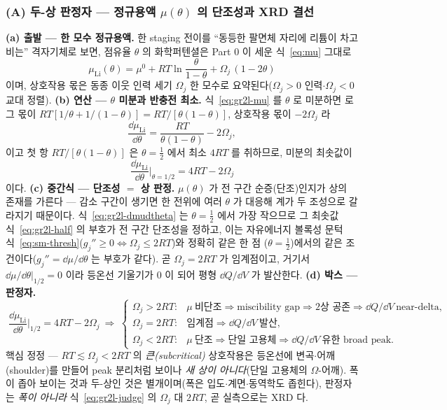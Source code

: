 \subsubsection*{(A) 두-상 판정자 --- 정규용액 $\mu(\theta)$ 의 단조성과 XRD 결선}
\textbf{(a) 출발 --- 한 모수 정규용액.} 한 staging 전이를 ``동등한 팔면체 자리에 리튬이 차고 비는'' 격자기체로
보면, 점유율 $\theta$ 의 화학퍼텐셜은 Part 0 이 세운 식~\eqref{eq:mu} 그대로
\begin{equation}
\mu_\mathrm{Li}(\theta)=\mu^0+RT\ln\frac{\theta}{1-\theta}+\Omega_j\,(1-2\theta)
\label{eq:gr2l-mu}
\end{equation}
이며, 상호작용 몫은 동종 이웃 인력 세기 $\Omega_j$ 한 모수로 요약된다($\Omega_j>0$ 인력$\cdot$$\Omega_j<0$
교대 정렬). \textbf{(b) 연산 --- $\theta$ 미분과 반충전 최소.} 식~\eqref{eq:gr2l-mu} 를 $\theta$ 로 미분하면
로그 몫이 $RT[1/\theta+1/(1-\theta)]=RT/[\theta(1-\theta)]$, 상호작용 몫이 $-2\Omega_j$ 라
\begin{equation}
\frac{\dd\mu_\mathrm{Li}}{\dd\theta}=\frac{RT}{\theta(1-\theta)}-2\Omega_j,
\label{eq:gr2l-dmudtheta}
\end{equation}
이고 첫 항 $RT/[\theta(1-\theta)]$ 은 $\theta=\tfrac12$ 에서 최소 $4RT$ 를 취하므로, 미분의 최솟값이
\begin{equation}
\frac{\dd\mu_\mathrm{Li}}{\dd\theta}\bigg|_{\theta=1/2}=4RT-2\Omega_j
\label{eq:gr2l-half}
\end{equation}
이다. \textbf{(c) 중간식 --- 단조성 $=$ 상 판정.} $\mu(\theta)$ 가 전 구간 순증(단조)인지가 상의 존재를
가른다 --- 감소 구간이 생기면 한 전위에 여러 $\theta$ 가 대응해 계가 두 조성으로 갈라지기 때문이다. 식~\eqref{eq:gr2l-dmudtheta}
는 $\theta=\tfrac12$ 에서 가장 작으므로 그 최솟값 식~\eqref{eq:gr2l-half} 의 부호가 전 구간 단조성을 정하고,
이는 자유에너지 볼록성 문턱 식~\eqref{eq:sm-thresh}($g_j''\ge0\Leftrightarrow\Omega_j\le2RT$)와 정확히 같은 한 점
($\theta=\tfrac12$)에서의 같은 조건이다($g_j''=\dd\mu/\dd\theta$ 는 부호가 같다). 곧 $\Omega_j=2RT$ 가
임계점이고, 거기서 $\dd\mu/\dd\theta|_{1/2}=0$ 이라 등온선 기울기가 $0$ 이 되어 평형 $\dd Q/\dd V$ 가 발산한다.
\textbf{(d) 박스 --- 판정자.}
\begin{equation}
\boxed{\;
\frac{\dd\mu_\mathrm{Li}}{\dd\theta}\bigg|_{1/2}=4RT-2\Omega_j
\ \Longrightarrow\
\begin{cases}
\Omega_j>2RT: & \mu\ \text{비단조}\Rightarrow\text{miscibility gap}\Rightarrow\text{2상 공존}\Rightarrow\dd Q/\dd V\ \text{near-delta},\\[2pt]
\Omega_j=2RT: & \text{임계점}\Rightarrow\dd Q/\dd V\ \text{발산},\\[2pt]
\Omega_j<2RT: & \mu\ \text{단조}\Rightarrow\text{단일 고용체}\Rightarrow\dd Q/\dd V\ \text{유한 broad peak}.
\end{cases}\;}
\label{eq:gr2l-judge}
\end{equation}
핵심 정정 --- $RT\lesssim\Omega_j<2RT$ 의 \emph{큰(subcritical)} 상호작용은 등온선에 변곡$\cdot$어깨(shoulder)를
만들어 peak 분리처럼 보이나 \emph{새 상이 아니다}(단일 고용체의 $\Omega$-어깨). 폭이 좁아 보이는 것과 두-상인
것은 별개이며(폭은 입도$\cdot$계면$\cdot$동역학도 좁힌다), 판정자는 \emph{폭이 아니라} 식~\eqref{eq:gr2l-judge}
의 $\Omega_j$ 대 $2RT$, 곧 실측으로는 XRD 다.

